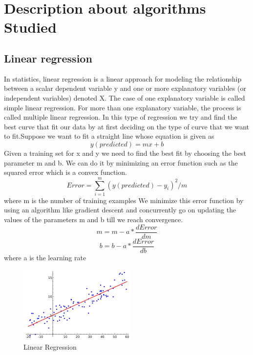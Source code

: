 \documentclass{report}
\begin{document}
 \newpage 
\section{Description about algorithms Studied}
\subsection{Linear regression}
In statistics, linear regression is a linear approach for modeling the relationship between a scalar dependent variable y and one or more explanatory variables (or independent variables) denoted X. The case of one explanatory variable is called simple linear regression. For more than one explanatory variable, the process is called multiple linear regression.
In this type of regression we try and find the best curve that fit our data by at first deciding on the type of curve that we want to fit.Suppose we want to fit a straight line whose equation is given as $$y(predicted)=mx+b$$
Given a training set for x and y we need to find the best fit by choosing the best parameter m and b. We can do it by minimizing an error function such as the squared error which is a convex function.
 $$Error=\sum_{i=1}^{m} (y(predicted)-y_{i})^2/m$$
 where m is the number of training examples
 We minimize this error function by using an algorithm like gradient descent and concurrently go on updating the values of the parameters m and b till we reach convergence.\newline
 $$m = m - a*\frac{dError}{dm}$$
 $$b = b - a*\frac{dError}{db}$$
 where a is the learning rate
\begin{figure}[H]
 \includegraphics[width=\linewidth]{linear_regression.png}
 \caption{Linear Regression}
\end{figure}
\end{document}
